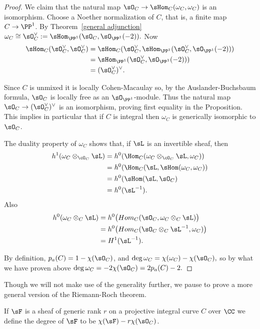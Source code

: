 \begin{proof}
 We claim that the natural map $\sO_C \to \sHom_C(\omega_C, \omega_C)$ is an isomorphism. Choose a Noether
normalization of $C$, that is, a finite map $C\to \PP^1$.
By Theorem~\ref{general adjunction} $\omega_C \cong \sO_C^\vee := \sHom_{\PP^1}(\sO_C,\sO_{\PP^1}(-2)).$
Now
$$
\begin{aligned}
\sHom_{C}(\sO_C^\vee,\sO_C^\vee ) &=\sHom_{C}(\sO_C^\vee, \sHom_{\PP^1}(\sO_C^\vee,\sO_{\PP^1}(-2)))\\
&= \sHom_{\PP^1}(\sO_C^\vee, \sO_{\PP^1}(-2)))\\
&= (\sO_C^\vee)^\vee.
\end{aligned}
$$

Since $C$ is unmixed it is locally Cohen-Macaulay so, by the Auslander-Buchsbaum formula, 
$\sO_C$ is locally free as an $\sO_{\PP^1}$-module.
Thus the natural map $\sO_C \to (\sO_C^\vee)^\vee$ is an isomorphism, proving first equality in the Proposition.
This implies in particular that if $C$ is integral then $\omega_C$ is generically isomorphic to $\sO_C$.

 The duality property of $\omega_C$ shows that, if $\sL$ is an invertible sheaf, then
$$
\begin{aligned}
h^1(\omega_C \otimes_{\cO_C} \sL) &= h^0(\Hom_C(\omega_C\otimes_{\cO_C} \sL, \omega_C))\\
&= h^0(\Hom_C(\sL, \sHom(\omega_C,\omega_C))\\
&=h^0 (\sHom(\sL, \sO_C)\\
&= h^0(\sL^{-1}).
\end{aligned}
$$
Also
$$
\begin{aligned}
h^0(\omega_C\otimes_C\sL) &= h^0 \bigl(Hom_C(\sO_C, \omega_C\otimes_C\sL)\bigr)\\
&=h^0 \bigl(Hom_C(\sO_C\otimes_C\sL^{-1}, \omega_C)\bigr)\\
&=H^1 (\sL^{-1}). 
\end{aligned}
$$

 By definition, $p_a(C) = 1-\chi(\sO_C)$, and 
 $\deg \omega_C = \chi(\omega_C) - \chi(\sO_C),$
 so by what we have proven above
 $\deg \omega_C = -2\chi(\sO_C) = 2p_a(C)-2.$
 \end{proof}

Though we will not make use of the generality further, we pause to prove a more general version of the Riemann-Roch theorem.

\begin{definition}
 If $\sF$ is a sheaf of generic rank $r$ on a projective integral curve $C$ over $\CC$ we define the degree
 of $\sF$ to be $\chi(\sF) -r\chi(\sO_C)$.
\end{definition}

